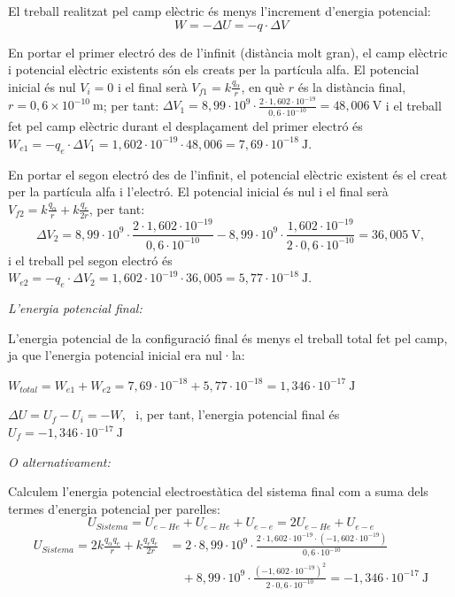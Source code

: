 \begin{solapartat}
 El treball realitzat pel camp elèctric és menys l'increment d'energia potencial:
\[ W = -\Delta U = -q\cdot\Delta V \]

 En portar el primer electró des de l'infinit (distància molt gran), el camp elèctric i potencial elèctric existents són els creats per la partícula alfa. El potencial inicial és nul $V_i = 0$ i el final serà $V_{f1} = k\frac{q_\alpha}{r}$, en què $r$ és la distància final, $r = 0,6\times 10^{-10}\ \mathrm{m}$; per tant: $\Delta V_1 = 8,99\cdot 10^{9}\cdot\frac{2\cdot 1,602\cdot 10^{-19}}{0,6\cdot 10^{-10}} = 48,006\ \mathrm{V}$ i el treball fet pel camp elèctric durant el desplaçament del primer electró és $W_{e1} = -q_e\cdot\Delta V_1 = 1,602\cdot 10^{-19}\cdot 48,006 = 7,69\cdot 10^{-18}\ \mathrm{J}$.

 En portar el segon electró des de l'infinit, el potencial elèctric existent és el creat per la partícula alfa i l'electró. El potencial inicial és nul i el final serà $V_{f2} = k\frac{q_\alpha}{r} + k\frac{q_e}{2r}$, per tant:
\[ \Delta V_2 = 8,99\cdot 10^{9}\cdot\frac{2\cdot 1,602\cdot 10^{-19}}{0,6\cdot 10^{-10}} - 8,99\cdot 10^{9}\cdot\frac{1,602\cdot 10^{-19}}{2\cdot 0,6\cdot 10^{-10}} = 36,005\ \mathrm{V}, \]
i el treball pel segon electró és $W_{e2} = -q_e\cdot\Delta V_2 = 1,602\cdot 10^{-19}\cdot 36,005 = 5,77\cdot 10^{-18}\ \mathrm{J}$.

\textit{L'energia potencial final:}

 L'energia potencial de la configuració final és menys el treball total fet pel camp, ja que l'energia potencial inicial era nul·la:

$W_{total} = W_{e1} + W_{e2} = 7,69\cdot 10^{-18} + 5,77\cdot 10^{-18} = 1,346\cdot 10^{-17}\ \mathrm{J}$

$\Delta U = U_f - U_i = -W$, \ i, per tant, l'energia potencial final és $U_f = -1,346\cdot 10^{-17}\ \mathrm{J}$

\textit{O alternativament:}

 Calculem l'energia potencial electroestàtica del sistema final com a suma dels termes d'energia potencial per parelles:
\[ U_{Sistema} = U_{e-He} + U_{e-He} + U_{e-e} = 2U_{e-He} + U_{e-e} \]
\begin{align*}
U_{Sistema} = 2k\frac{q_\alpha q_e}{r} + k\frac{q_e q_e}{2r} &= 2\cdot 8,99\cdot 10^{9}\cdot\frac{2\cdot 1,602\cdot 10^{-19}\cdot(-1,602\cdot 10^{-19})}{0,6\cdot 10^{-10}}\\
&\quad + 8,99\cdot 10^{9}\cdot\frac{(-1,602\cdot 10^{-19})^2}{2\cdot 0,6\cdot 10^{-10}} = -1,346\cdot 10^{-17}\ \mathrm{J}
\end{align*}
\end{solapartat}
